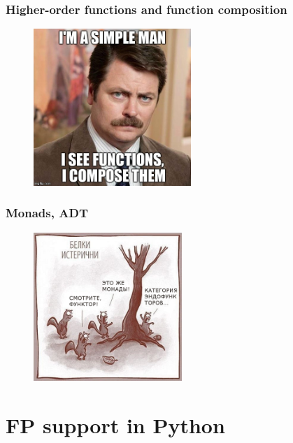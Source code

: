 \documentclass[18pt, compress, aspectratio=169]{beamer}
\begin{document}
\begin{frame}
    \frametitle{Higher-order functions and function composition}
    \vspace{-25pt}
    \begin{figure}
        \includegraphics[width=0.53\textwidth,center]{function_composition.jpg}
    \end{figure}
\end{frame}

\begin{frame}
    \frametitle{Monads, ADT}
    \vspace{-20pt}
    \begin{figure}
        \includegraphics[width=0.5\textwidth,center]{squirells.png}
    \end{figure}
\end{frame}

\section{FP support in Python}
\end{document}
